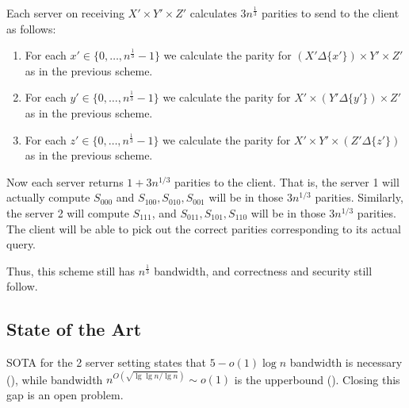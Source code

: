 Each server on receiving $X' \times Y' \times Z'$ calculates $3 n^{\frac1 3}$ parities to send to the client as follows:
\begin{enumerate}
	\item For each $x' \in \{0,\dots,n^{\frac 1 3} - 1\}$ we calculate the parity for $(X' \Delta \{x'\}) \times Y' \times  Z'$ as in the previous scheme.
	\item For each $y' \in \{0,\dots,n^{\frac 1 3} - 1\}$ we calculate the parity for $X' \times (Y' \Delta \{y'\}) \times  Z'$ as in the previous scheme.
	\item For each $z' \in \{0,\dots,n^{\frac 1 3} - 1\}$ we calculate the parity for $X' \times Y' \times  (Z' \Delta \{z'\})$ as in the previous scheme.
\end{enumerate}

Now each server returns $1+3n^{1/3}$ parities to the client.
That is, the server 1 will actually compute $S_{000}$ and $S_{100}, S_{010}, S_{001}$ will be in those $3n^{1/3}$ parities. 
Similarly, the server 2 will compute $S_{111}$, and $S_{011},S_{101},S_{110}$ will be in those $3n^{1/3}$ parities.
The client will be able to pick out the correct parities corresponding to its actual query.

Thus, this scheme still has $n^{\frac 1 3}$ bandwidth, and correctness and security still follow.

\subsection{State of the Art}
	SOTA for the 2 server setting states that $5 - o(1)\log n$ bandwidth is necessary (\cite{WdW05}),  while bandwidth  
	$n^{O\left(\sqrt{\lg \lg n / \lg n}\right)} \sim o(1)$ is the upperbound (\cite{dvir20162}). Closing this gap is an open problem. 
